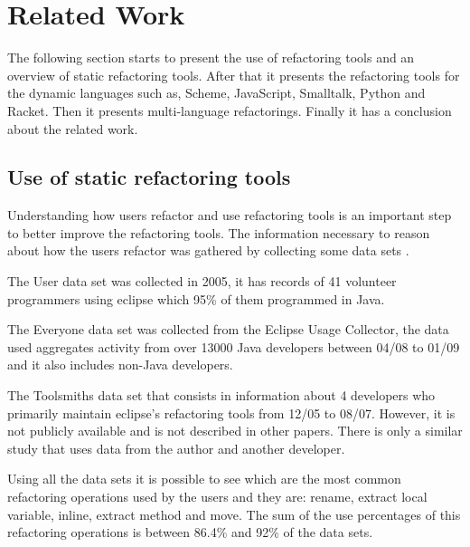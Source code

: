 
% 
% 

\section{Related Work}


The following section starts to present the use of refactoring tools and an overview of static refactoring tools.
After that it presents the refactoring tools for the dynamic languages such as, Scheme, JavaScript, Smalltalk, Python and Racket.
Then it presents multi-language refactorings.
Finally it has a conclusion about the related work.

\subsection{Use of static refactoring tools}

Understanding how users refactor and use refactoring tools is an important step to better improve the refactoring tools.
The information necessary to reason about how the users refactor was gathered by collecting some data sets \cite{murphy2012we}.


The User data set was collected \cite{murphy2006java} in 2005, it has records of 41 volunteer programmers using eclipse which 95\% of them programmed in Java. %

The Everyone data set was collected from the Eclipse Usage Collector, the data used aggregates activity from over 13000 Java developers between 04/08 to 01/09 and it also includes non-Java developers.

The Toolsmiths data set that consists in information about 4 developers who primarily maintain eclipse's refactoring tools from 12/05 to 08/07. 
However, it is not publicly available and is not described in other papers.
There is only a similar study \cite{robbes2007mining} that uses data from the author and another developer. 


Using all the data sets it is possible to see which are the most common refactoring operations used by the users and they are: rename, extract local variable, inline, extract method and move. The sum of the use percentages of this refactoring operations is between 86.4\% and 92\% of the data sets. %


